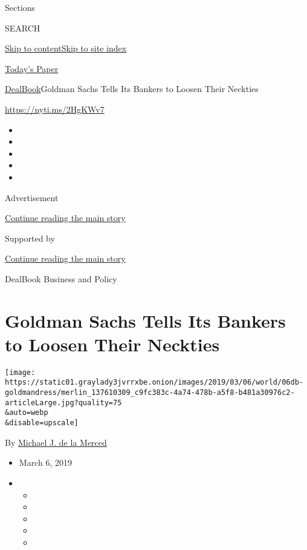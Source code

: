 Sections

SEARCH

\protect\hyperlink{site-content}{Skip to
content}\protect\hyperlink{site-index}{Skip to site index}

\href{https://myaccount.nytimes3xbfgragh.onion/auth/login?response_type=cookie\&client_id=vi}{}

\href{https://www.nytimes3xbfgragh.onion/section/todayspaper}{Today's
Paper}

\href{/section/business/dealbook}{DealBook}\textbar{}Goldman Sachs Tells
Its Bankers to Loosen Their Neckties

\href{https://nyti.ms/2HgKWv7}{https://nyti.ms/2HgKWv7}

\begin{itemize}
\item
\item
\item
\item
\item
\end{itemize}

Advertisement

\protect\hyperlink{after-top}{Continue reading the main story}

Supported by

\protect\hyperlink{after-sponsor}{Continue reading the main story}

DealBook Business and Policy

\hypertarget{goldman-sachs-tells-its-bankers-to-loosen-their-neckties}{%
\section{Goldman Sachs Tells Its Bankers to Loosen Their
Neckties}\label{goldman-sachs-tells-its-bankers-to-loosen-their-neckties}}

\texttt{[image: https://static01.graylady3jvrrxbe.onion/images/2019/03/06/world/06db-goldmandress/merlin\_137610309\_c9fc383c-4a74-478b-a5f8-b481a30976c2-articleLarge.jpg?quality=75\\\&auto=webp\\\&disable=upscale]}

By
\href{https://www.nytimes3xbfgragh.onion/by/michael-j-de-la-merced}{Michael
J. de la Merced}

\begin{itemize}
\item
  March 6, 2019
\item
  \begin{itemize}
  \item
  \item
  \item
  \item
  \item
  \end{itemize}
\end{itemize}


